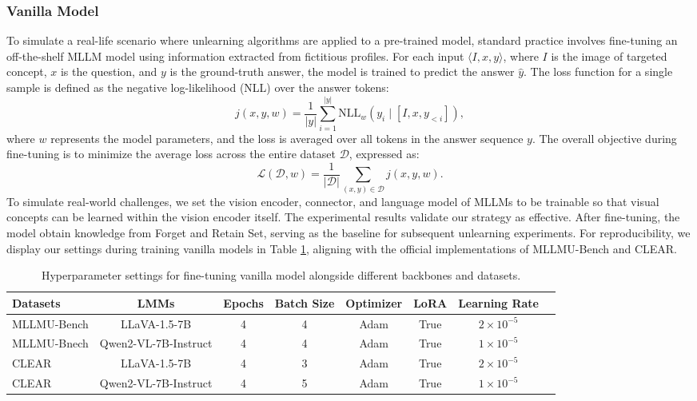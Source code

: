 \subsubsection{Vanilla Model}\label{app:vanilla}
To simulate a real-life scenario where unlearning algorithms are applied to a pre-trained model, standard practice involves fine-tuning an off-the-shelf MLLM model using information extracted from fictitious profiles. For each input \ensuremath{\langle I, x, y \rangle}, where $I$ is the image of targeted concept, $x$ is the question, and $y$ is the ground-truth answer, the model is trained to predict the answer $\hat{y}$. The loss function for a single sample is defined as the negative log-likelihood (NLL) over the answer tokens:
\begin{equation}
    j(x, y, w) = \frac{1}{|y|} \sum_{i=1}^{|y|} \text{NLL}_w(y_i \mid [I, x, y_{<i}]),
\end{equation}
where $w$ represents the model parameters, and the loss is averaged over all tokens in the answer sequence $y$. The overall objective during fine-tuning is to minimize the average loss across the entire dataset $\mathcal{D}$, expressed as:
\begin{equation}
    \mathcal{L}(\mathcal{D}, w) = \frac{1}{|\mathcal{D}|} \sum_{(x,y) \in \mathcal{D}} j(x, y, w).
\end{equation}
To simulate real-world challenges, we set the vision encoder, connector, and language model of MLLMs to be trainable so that visual concepts can be learned within the vision encoder itself. The experimental results validate our strategy as effective. After fine-tuning, the model obtain knowledge from Forget and Retain Set, serving as the baseline for subsequent unlearning experiments. For reproducibility, we display our settings during training vanilla models in Table \ref{tab:vanilla}, aligning with the official implementations of MLLMU-Bench and CLEAR.
\begin{table}[h]
    \centering
    \begin{tabular}{l c c c c c c c}
        \hline
        Datasets & LMMs & Epochs& Batch Size & Optimizer & LoRA & Learning Rate \\
        \hline
        MLLMU-Bench & LLaVA-1.5-7B & 4 & 4 & Adam & True &$2 \times 10^{-5}$ \\
        MLLMU-Bnech & Qwen2-VL-7B-Instruct  & 4 & 4 & Adam & True & $1 \times 10^{-5}$ \\
        CLEAR & LLaVA-1.5-7B & 4 & 3 & Adam & True & $2 \times 10^{-5}$ \\
        CLEAR & Qwen2-VL-7B-Instruct  & 4 & 5 & Adam & True & $1 \times 10^{-5}$ \\
        \hline
    \end{tabular}
    \caption{Hyperparameter settings for fine-tuning vanilla model alongside different backbones and datasets.}
    \label{tab:vanilla}
\end{table}




